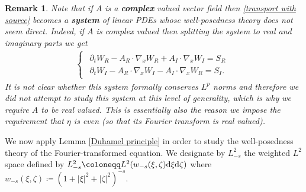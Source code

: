 \documentclass[11pt,reqno]{amsart}
\newtheorem{rem}[thm]{Remark}
\numberwithin{equation}{section}
\def\dd{{\rm d}}
\begin{document}
\begin{rem}
Note that if $A$ is a \textbf{complex} valued vector field then \eqref{transport with source} becomes a \textbf{system} of linear PDEs whose well-posedness theory does not seem direct. Indeed, if $A$ is complex valued then splitting the system to real and imaginary parts we get 
\begin{align*}
\begin{cases}
\begin{array}{lc}
\partial_{t}W_{R}-A_{R}\cdot \nabla_{x}W_{R}+A_{I}\cdot \nabla_{x}W_{I}=S_{R}\\
\partial_{t}W_{I}-A_{R}\cdot \nabla_{x}W_{I}-A_{I}\cdot\nabla_{x}W_{R}=S_{I}.  
\end{array}\end{cases}
\end{align*}
It is not clear whether this system formally conserves $L^{p}$ norms and therefore we did not attempt to study this system at this level of generality, which is why  we require $A$ to be real valued. This is essentially also the reason we impose the requirement that $\eta$ is even (so that its Fourier transform is real valued).   
\end{rem}
We now apply Lemma \ref{Duhamel principle} in order to study the well-posedness theory of the Fourier-transformed equation. We designate by $L^{2}_{-s}$   the weighted $L^{2}$ space defined by $L^{2}_{-s}\coloneqq L^{2}(w_{-s}(\xi,\zeta) \dd \xi\dd \zeta)$ where $w_{-s}(\xi,\zeta)\coloneqq (1+\left\vert \xi\right\vert^{2}+\left\vert \zeta\right\vert^{2} )^{-s}$.  
\end{document}
